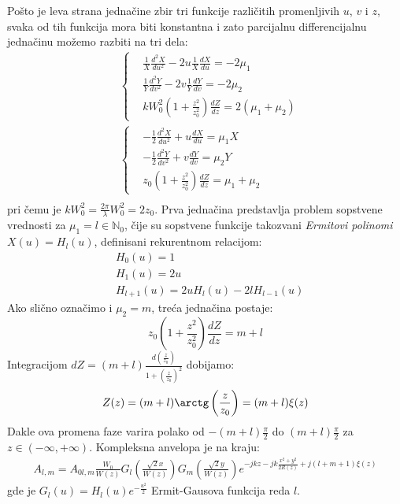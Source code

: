 \documentclass[fleqn]{report}
\begin{document}
Pošto je leva strana jednačine zbir tri funkcije različitih promenljivih $u$, $v$ i $z$, svaka od tih funkcija mora biti konstantna i zato parcijalnu differencijalnu jednačinu možemo razbiti na tri dela:
\begin{align*}
     & \begin{cases}
            & \frac{1}{X}\frac{d^2X}{du^2} - 2u\frac{1}{X}\frac{dX}{du} = -2\mu_1         \\
            & \frac{1}{Y}\frac{d^2Y}{dv^2} - 2v\frac{1}{Y}\frac{dY}{dv} = -2\mu_2         \\
            & k W_0^2 \left(1 + \frac{z^2}{z_0^2}\right) \frac{dZ}{dz} = 2(\mu_1 + \mu_2)
       \end{cases} \\
     & \begin{cases}
            & -\frac{1}{2}\frac{d^2X}{du^2} + u\frac{dX}{du} = \mu_1 X             \\
            & -\frac{1}{2}\frac{d^2Y}{dv^2} + v\frac{dY}{dv} = \mu_2 Y             \\
            & z_0 \left(1 + \frac{z^2}{z_0^2}\right) \frac{dZ}{dz} = \mu_1 + \mu_2
       \end{cases}        \\
\end{align*}
pri čemu je $kW_0^2 = \frac{2\pi}{\lambda} W_0^2 = 2z_0$.
Prva jednačina predstavlja problem sopstvene vrednosti za $\mu_1 = l \in \mathbb{N}_0$, čije su sopstvene funkcije takozvani \emph{Ermitovi polinomi} $X(u) = H_l(u)$, definisani rekurentnom relacijom:
\begin{align*}
     & H_0(u) = 1                                  \\
     & H_1(u) = 2u                                 \\
     & H_{l + 1}(u) = 2u H_l (u) - 2l H_{l - 1}(u)
\end{align*}
Ako slično označimo i $\mu_2 = m$, treća jednačina postaje:
\begin{equation*}
    z_0 \left(1 + \frac{z^2}{z_0^2}\right) \frac{dZ}{dz} = m + l
\end{equation*}
Integracijom $dZ = (m + l) \frac{d\left(\frac{z}{z_0}\right)}{1 + \left(\frac{z}{z_0}\right)^2}$ dobijamo:
\begin{equation*}
    Z(z) = (m + l) \arctg\left(\frac{z}{z_0}\right) = (m + l) \xi(z)
\end{equation*}
Dakle ova promena faze varira polako od $-(m + l)\frac{\pi}{2}$ do $(m + l)\frac{\pi}{2}$ za $z \in (-\infty, +\infty)$.
Kompleksna anvelopa je na kraju:
\begin{align*}
    A_{l, m} = A_{0l,m} \frac{W_0}{W(z)} G_l\left(\frac{\sqrt2 x}{W(z)}\right) G_m\left(\frac{\sqrt2 y}{W(z)}\right)e^{-jkz - jk\frac{x^2 + y^2}{2R(z)} + j(l + m + 1)\xi(z)}
\end{align*}
gde je $G_l(u) = H_l(u)e^{-\frac{u^2}{2}}$ Ermit-Gausova funkcija reda $l$.
\end{document}
